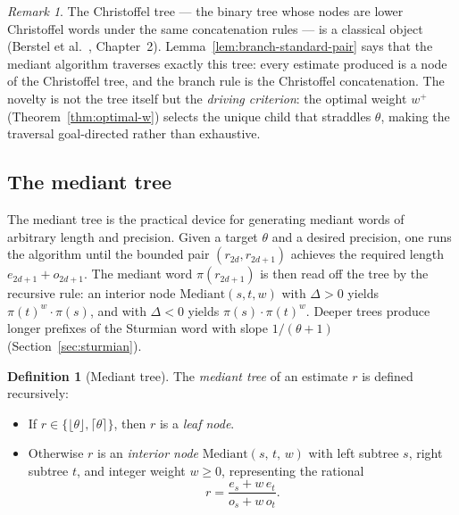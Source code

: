 \documentclass[12pt]{article}
\theoremstyle{definition}
\newtheorem{definition}[theorem]{Definition}
\theoremstyle{remark}
\newtheorem{remark}[theorem]{Remark}
\theoremstyle{plain}
\newcommand{\wplus}{w^{+}}
\begin{document}
\begin{remark}
The Christoffel tree --- the binary tree whose nodes are lower Christoffel words
under the same concatenation rules --- is a classical object (Berstel et
al.~\cite{berstel2009}, Chapter~2).
Lemma~\ref{lem:branch-standard-pair} says that the mediant algorithm traverses
exactly this tree: every estimate produced is a node of the Christoffel tree, and
the branch rule is the Christoffel concatenation.
The novelty is not the tree itself but the \emph{driving criterion}: the optimal
weight $\wplus$ (Theorem~\ref{thm:optimal-w}) selects the unique child that
straddles $\theta$, making the traversal goal-directed rather than exhaustive.
\end{remark}

\subsection{The mediant tree}
\label{sec:tree}

The mediant tree is the practical device for generating mediant words of arbitrary
length and precision.
Given a target $\theta$ and a desired precision, one runs the algorithm until the
bounded pair $(r_{2d}, r_{2d+1})$ achieves the required length $e_{2d+1} + o_{2d+1}$.
The mediant word $\pi(r_{2d+1})$ is then read off the tree by the recursive rule:
an interior node $\mathrm{Mediant}(s, t, w)$ with $\Delta > 0$ yields
$\pi(t)^w \cdot \pi(s)$, and with $\Delta < 0$ yields
$\pi(s) \cdot \pi(t)^w$.
Deeper trees produce longer prefixes of the Sturmian word with slope $1/(\theta+1)$
(Section~\ref{sec:sturmian}).

\begin{definition}[Mediant tree]
\label{def:mediant-tree}
The \emph{mediant tree} of an estimate $r$ is defined recursively:
\begin{itemize}
  \item If $r \in \{\lfloor \theta \rfloor, \lceil \theta \rceil\}$, then $r$ is a
        \emph{leaf node}.
  \item Otherwise $r$ is an \emph{interior node} $\mathrm{Mediant}(s,\, t,\, w)$
        with left subtree $s$, right subtree $t$, and integer weight $w \geq 0$,
        representing the rational
        \[
          r = \frac{e_s + w\,e_t}{o_s + w\,o_t}.
        \]
\end{itemize}
\end{definition}
\end{document}
